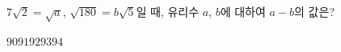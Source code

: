 $7\sqrt{2}=\sqrt{a}$, $\sqrt{180}=b\sqrt{5}$일 때, 유리수 $a$, $b$에 대하여 $a-b$의 값은?
\begin{choices32}{$90$}{$91$}{$92$}{$93$}{$94$}\end{choices32}

